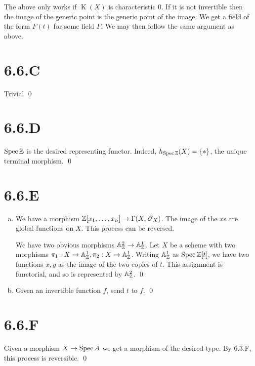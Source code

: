 \documentclass{article}
\begin{document}
The above only works if $\operatorname{K}(X)$ is characteristic 0. If it is
not invertible then the image of the generic point is the generic point of the
image. We get a field of the form $F(t)$ for some field
$F$. We may then follow the same argument as above.

\section{6.6.C}
Trivial \qed

\section{6.6.D}
$\operatorname{Spec} \mathbb{Z}$ is the desired representing functor. Indeed,
$h_{\operatorname{Spec} \mathbb{Z}}(X)=\{*\}$, the unique terminal morphism. \qed

\section{6.6.E}
\begin{enumerate}[a.]
    \item We have a morphism $\mathbb{Z}[x_1, \dots, x_n] \to \Gamma(X, \operatorname{\mathscr{O}}_X)$. The image of the
          $x$s are global functions on $X$. This
          process can be reversed.

          We have two obvious morphisms $\mathbb{A}^2_{\mathbb{Z}} \to \mathbb{A}^1_{\mathbb{Z}}$. Let
          $X$ be a scheme with two morphisms $\pi_1: X \to \mathbb{A}^1_{\mathbb{Z}}, \pi_2: X \to \mathbb{A}^1_{\mathbb{Z}}$.
          Writing $\mathbb{A}^1_{\mathbb{Z}}$ as $\operatorname{Spec} \mathbb{Z}[t]$, we have two functions
          $x, y$ as the image of the two copies of
          $t$. This assignment is functorial, and so is represented by
          $\mathbb{A}^2_{\mathbb{Z}}$. \qed
    \item Given an invertible function $f$, send
          $t$ to $f$. \qed
\end{enumerate}

\section{6.6.F}
Given a morphism $X \to \operatorname{Spec} A$ we get a morphism of the desired type.
By 6.3.F, this process is reversible. \qed
\end{document}
